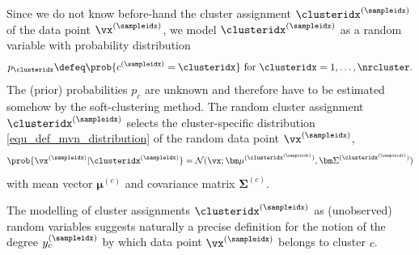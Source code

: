 \documentclass[12pt]{report}
\begin{document}
Since we do not know before-hand the cluster assignment $\clusteridx^{(\sampleidx)}$ 
of the data point $\vx^{(\sampleidx)}$, we model $\clusteridx^{(\sampleidx)}$ 
as a random variable with probability distribution  
\begin{equation} 
\label{equ_def_cluster_prob}
p_{\clusteridx} \defeq \prob{c^{(\sampleidx)}=\clusteridx} \mbox{ for } \clusteridx=1,\ldots,\nrcluster.
\end{equation}  
The (prior) probabilities $p_{c}$ are unknown and therefore have 
to be estimated somehow by the soft-clustering method. The random 
cluster assignment $\clusteridx^{(\sampleidx)}$ selects the cluster-specific 
distribution \eqref{equ_def_mvn_distribution} of the random data point $\vx^{(\sampleidx)}$, 
\begin{equation}
\label{equ_cond_dist_GMM}
 \prob{\vx^{(\sampleidx)} | \clusteridx^{(\sampleidx)} } = \mathcal{N} (\vx; {\bm \mu}^{(\clusteridx^{(\sampleidx)})}, {\bm \Sigma}^{(\clusteridx^{(\sampleidx)})})
\end{equation} 
with mean vector ${\bm \mu}^{(c)}$ and covariance matrix ${\bm \Sigma}^{(c)}$. 

The modelling of cluster assignments $\clusteridx^{(\sampleidx)}$ as 
(unobserved) random variables suggests naturally a precise definition 
for the notion of the degree $y^{(\sampleidx)}_{c}$ by which data point 
$\vx^{(\sampleidx)}$ belongs to cluster $c$. 
\end{document}
